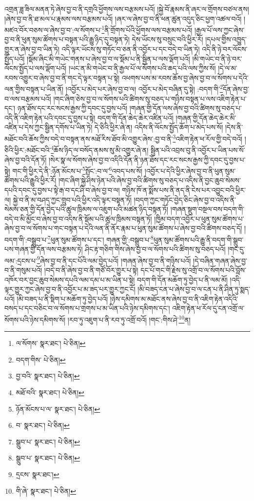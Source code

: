 འགྲན་ཟླ་ཟིལ་མནན་ཏེ་ཞེས་བྱ་བ་ནི་དགྲའི་ཕྱོགས་ལས་བརྩམས་པའོ། །སྐྱེ་བོ་རྣམས་ནི་ཞར་ལ་གྲོགས་བཙལ་ནས། །ཞེས་བྱ་བ་ནི་ཐ་མལ་པ་རྣམས་ལས་བརྩམས་པའོ། །ཞར་ལ་ཞེས་བྱ་བ་ནི་ཕན་ཚུན་འདུད་ཅིང་ཕྱག་འཚལ་བའོ། །མཛའ་བོར་བཅས་ལ་ཞེས་བྱ་བ་:ལ་སོགས་པ་\footnote{ལ་སོགས་  སྣར་ཐང་།  པེ་ཅིན། }ནི་གྲོགས་པོའི་ཕྱོགས་ལས་བརྩམས་པའོ། །རྒྱལ་པོ་ལས་ཀྱང་ཞེས་བྱ་བ་ནི་ཕུན་སུམ་ཚོགས་པ་བསྟན་པའི་རྒྱུ་ཉིད་དུ་བསྟན་ཏེ། དེས་ཡོངས་སུ་བསྲུང་བའི་ཕྱིར་རོ། །དཔལ་གྱིས་འཁྱུད་གྱུར་ན་ཞེས་བྱ་བ་ཡིན་ཏེ། འདི་ལྟར་ཡོངས་སུ་གཏོང་བ་ཅན་ནི་འབྱོར་པ་དང་བདེ་བ་ཡིན་ཏེ། འདི་ནི་ཉེ་བར་ལོངས་སྤྱོད་པའོ། །སྡོམ་ཞིང་མི་གཡེང་གནས་པ་ཞེས་བྱ་བ་ལ་སྡོམ་པ་ནི་སྦྱིན་པ་ལས་ལྡོག་པའོ། །མི་གཡེང་བ་ནི་ཉེ་བར་ལོངས་སྤྱོད་པ་ལས་ལྡོག་པའོ། །ཡང་ན་མི་གཡེང་བ་ནི་རྒྱལ་པོ་ལ་སོགས་པའི་ཆད་པའི་ལས་ཀྱིས་སོ། །དེ་ལ་མ་རབས་འགྱུར་བ་ཞེས་བྱ་བ་ནི་གང་དེ་ལྟར་བསྟན་པ་སྟེ། འཕགས་པས་མ་རབས་ཆོས་བྱ་ཞེས་བྱ་བ་ལ་སོགས་པ་དེའི་ལན་གྱིས་བསྟན་པ་ཡིན་ནོ། །འབྱོར་པ་མེད་པར་ཞེས་བྱ་བ་ལ། འབྱོར་པ་མེད་བཞིན་དུ་སྟེ། :བདག་གི་\footnote{བདག་གིས་  པེ་ཅིན། }དོན་ཞེས་བྱ་བ་ལས་བརྩམས་པའོ། །གང་ཞིག་ཅེས་བྱ་བ་ལ་སོགས་པའི་ཚིགས་སུ་བཅད་པ་གཉིས་བསྟན་པ་ལས་འཇིག་རྟེན་པ་དང་། ཉན་ཐོས་དང་རང་སངས་རྒྱས་ཀྱི་དབང་དུ་བྱས་པའོ། །གཞན་གྱི་དོན་ལས་ཞེས་བྱ་བའི་ཚིགས་སུ་བཅད་པ་འདི་ནི་འཇིག་རྟེན་པའི་དབང་དུ་བྱས་པ་སྟེ། བདག་གི་དོན་ཆེད་ཆེར་འཛིན་པའོ། །གཞན་གྱི་དོན་ཆེད་ཆེར་མི་འཛིན་པ་དེས་ཀྱང་སྦྱིན་དགོས་པ་ཡིན་ཏེ། དེ་ཅིའི་ཕྱིར་ཞེ་ན། འདིས་ནི་ལོངས་སྤྱོད་ཆོག་པ་མེད་པས་སོ། །དེས་ནི་མཐོང་བའི་ཆོས་ཀྱིས་བདེ་བ་བསྟན་ནས་མཐོ་རིས་ཐོབ་མི་འགྱུར་ཞེས་:བྱ་བ་ནི་\footnote{བྱ་བའི་  སྣར་ཐང་།  པེ་ཅིན། }འཇིག་རྟེན་ཕ་རོལ་གྱི་བདེ་བའོ། །ཅིའི་ཕྱིར་:མཐོང་བའི་\footnote{མཐོ་བའི་  སྣར་ཐང་།  པེ་ཅིན། }ཆོས་ཉིད་ལ་བསོད་ནམས་སུ་མི་འགྱུར་ཞེ་ན། སྦྱིན་པའི་འབྲས་བུ་ནི་འབྱོར་པ་ཡིན་པས་སོ་ཞེས་བྱ་བའི་དོན་ཏོ། །སེར་སྣ་ལ་སོགས་ཞེས་བྱ་བ་འདིའི་དོན་ནི་ཉན་ཐོས་དང་རང་སངས་རྒྱས་ཀྱི་དབང་དུ་བྱས་པ་སྟེ། གང་གི་ཕྱིར་དེ་ནི་:ཉོན་མོངས་པ་\footnote{ཉོན་མོངས་པ་ལ་  སྣར་ཐང་།  པེ་ཅིན། }སྤོང་:བ་ལ་\footnote{བ་  སྣར་ཐང་།  པེ་ཅིན། }འབད་པས་སོ། །འབྱོར་པ་དེའི་ཕྱིར་ཞེས་བྱ་བ་ནི་ཕུན་སུམ་ཚོགས་པའི་རྒྱུའི་ཕྱིར་རོ། །གང་ཞིག་སྐྱེ་ཤིས་ཉེན་པའི་ཞེས་བྱ་བའི་ཚིགས་སུ་བཅད་པ་འདིས་ནི་བྱང་ཆུབ་སེམས་དཔའི་དབང་དུ་བྱས་པ་སྟེ་རྒ་བ་དང་ཤི་བ་ཞེས་བྱ་བ་ལ། གཉིས་ཁོ་ན་སྨོས་པས་ནི་ནད་ནི་ངེས་པར་འབྱུང་བའི་ཕྱིར་ལ། སྐྱེ་བ་ནི་མ་བཤད་ཀྱང་གྲུབ་པའི་ཕྱིར་འདི་ལྟར་བསྟན་ཏོ། །བདག་ཀྱང་གཏོང་བྱེད་ཅིང་ཞེས་བྱ་བ་འདིས་ནི་སེམས་ཅན་གྱི་དོན་བྱེད་པའི་ཚུལ་ཁྲིམས་ལ་འཇུག་པའི་མཚན་ཉིད་བསྟན་ཏོ། །གཞན་སྡུག་བསྔལ་བས་བདག་གི་བདེ་བ་མི་མྱོང་བ་ཞེས་བྱ་བ་འདིས་ནི་སྡོམ་པའི་ཚུལ་ཁྲིམས་བསྟན་ཏོ། །ཁྱིམ་བདག་འབྱོར་པ་ཕུན་སུམ་ཚོགས་པ་ཞེས་བྱ་བ་ལ་སོགས་པ་གང་བསྟན་པ་དེའི་ལན་ནི་ནོར་རྣམ་པ་ཕུན་སུམ་ཚོགས་པ་ཞེས་བྱ་བའི་ཚིགས་བཅད་དོ། །བདག་གི་:བསྒྲུབ་པ་\footnote{སྒྲུབ་པ་  སྣར་ཐང་།  པེ་ཅིན། }ཕུན་སུམ་ཚོགས་པ་དང་། གཞན་གྱི་:བསྒྲུབ་པ་\footnote{སྒྲུབ་པ་  སྣར་ཐང་།  པེ་ཅིན། }ཕུན་སུམ་ཚོགས་པའི་རྒྱུ་ནི་བདག་གི་སྒྲུབ་པས་གཞན་གྱི་དོན་ལས་བརྩམས་ཏེ། ཤིང་རྟ་གཅིག་གིས་ཞེས་བྱ་བ་ལ་སོགས་པའི་ཚིགས་སུ་བཅད་པའོ། །གང་དུ་ལམ་:དྲངས་པ་\footnote{དྲངས་  སྣར་ཐང་། }ཞེས་བྱ་བ་ནི་དང་པོའི་ལམ་བྱེད་པའོ། །གཞན་ཞེས་བྱ་བ་ནི་གཉིས་པའོ། །དེ་བཞིན་གཞན་ཞེས་བྱ་བ་ནི་གསུམ་པའོ། །བདེ་བ་ནི་ཞེས་བྱ་བ་ནི་གཙོ་བོར་གྱུར་པ་སྟེ། དང་པོ་གང་གི་རྗེས་སུ་འགྲོ་བ་ལ་སོགས་པའི་བློས་འཁོར་བར་བྱང་ཆུབ་སེམས་དཔའི་ལམ་དམ་པ་མ་ཡིན་པ་སྟེ། བདག་གི་དོན་མཆོག་ཏུ་བྱེད་པ་ནི་ལམ་མོ། །འདི་ལྟར་གྱུར་ཀྱང་ཞེས་བྱ་བ་ནི་འབྱོར་པ་མ་ཟད་པར་གྱུར་ཀྱང་ངོ། །མི་བཟད་ངན་པ་ཞེས་བྱ་བ་ལ་ངན་པ་ནི་ཤིན་ཏུ་སྨད་པའོ། །མི་བཟད་པ་ནི་སྡིག་པ་མཆོག་ཏུ་བྱེད་པའོ། །ཉེས་དམིགས་མ་མཐོང་ནས་ཞེས་བྱ་བ་ནི་འཇིག་རྟེན་འདིའི་བསད་པ་དང་བཅིང་བ་ལ་སོགས་པ་གྲགས་པ་མ་ཡིན་པའི་ཉེས་དམིགས་དང་། འཇིག་རྟེན་ཕ་རོལ་དུ་ངན་འགྲོ་ལ་སོགས་པའི་ཉེས་དམིགས་སོ། །རབ་ཏུ་འཇུག་པ་ནི་རབ་ཏུ་འགྲོ་བའོ། །གང་:གིས་ཤེ་\footnote{གི་ཞེ་  སྣར་ཐང་།  པེ་ཅིན། }ན། 